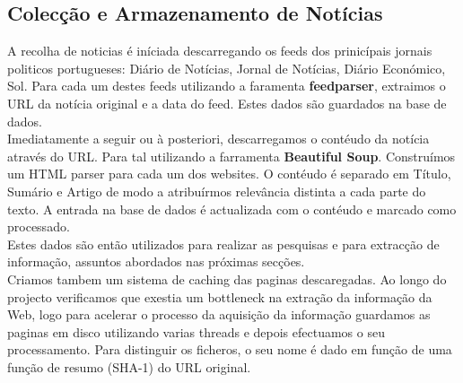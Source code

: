 \subsection{Colecção e Armazenamento de Notícias}
\label{sec:news_storage}
\hspace{15pt}A recolha de noticias é iníciada descarregando os feeds dos prinicípais jornais politicos portugueses: Diário de Notícias, Jornal de Notícias, Diário Económico, Sol. Para cada um destes feeds utilizando a faramenta \textbf{feedparser}, extraimos o URL da notícia original e a data do feed. Estes dados são guardados na base de dados.\\
Imediatamente a seguir ou à posteriori, descarregamos o contéudo da notícia através do URL. Para tal utilizando a farramenta \textbf{Beautiful Soup}. Construímos um HTML parser para cada um dos websites. O contéudo é separado em Título, Sumário e Artigo de modo a atribuírmos relevância distinta a cada parte do texto. A entrada na base de dados é actualizada com o contéudo e marcado como processado.\\
Estes dados são então utilizados para realizar as pesquisas e para extracção de informação, assuntos abordados nas próximas secções.\\
Criamos tambem um sistema de caching das paginas descaregadas. Ao longo do projecto verificamos que exestia um bottleneck na extração da informação da Web, logo para acelerar o processo da aquisição da informação guardamos as paginas em disco utilizando varias threads e depois efectuamos o seu processamento. Para distinguir os ficheros, o seu nome é dado em função de uma função de resumo (SHA-1) do URL original.